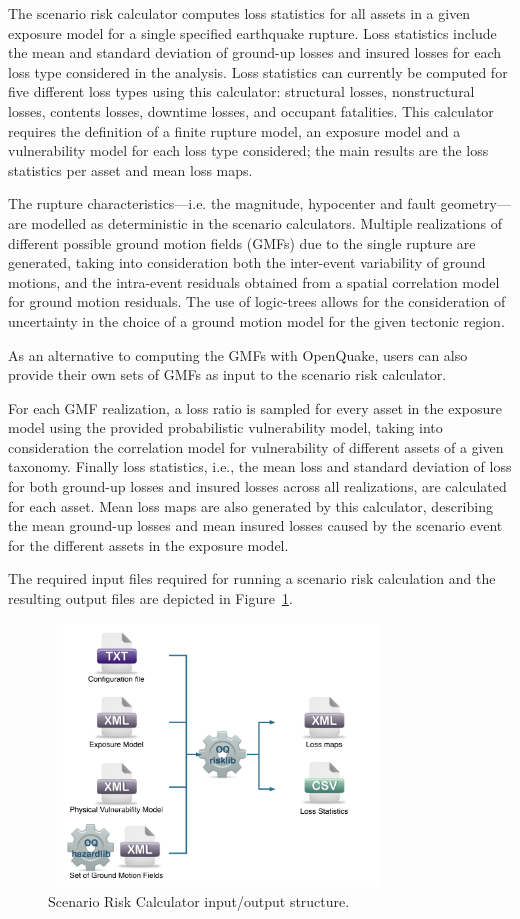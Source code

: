 The scenario risk calculator computes loss statistics for all assets in a
given exposure model for a single specified earthquake rupture. Loss
statistics include the mean and standard deviation of ground-up losses and
insured losses for each loss type considered in the analysis. Loss statistics
can currently be computed for five different loss types using this calculator:
structural losses, nonstructural losses, contents losses, downtime losses, and
occupant fatalities. This calculator requires the definition of a finite
rupture model, an exposure model and a vulnerability model for each loss type
considered; the main results are the loss statistics per asset and mean loss
maps.

The rupture characteristics—i.e. the magnitude, hypocenter and fault
geometry—are modelled as deterministic in the scenario calculators. Multiple
realizations of different possible ground motion fields (GMFs) due to the
single rupture are generated, taking into consideration both the inter-event
variability of ground motions, and the intra-event residuals obtained from a
spatial correlation model for ground motion residuals. The use of logic-trees
allows for the consideration of uncertainty in the choice of a ground motion
model for the given tectonic region.

As an alternative to computing the GMFs with OpenQuake, users can also provide
their own sets of GMFs as input to the scenario risk calculator.

For each GMF realization, a loss ratio is sampled for every asset in the
exposure model using the provided probabilistic vulnerability model, taking
into consideration the correlation model for vulnerability of different assets
of a given taxonomy. Finally loss statistics, i.e., the mean loss and standard
deviation of loss for both ground-up losses and insured losses across all
realizations, are calculated for each asset. Mean loss maps are also generated
by this calculator, describing the mean ground-up losses and mean insured
losses caused by the scenario event for the different assets in the exposure
model.

The required input files required for running a scenario risk calculation and
the resulting output files are depicted in Figure~\ref{fig:io-structure-scenario-risk}.

\begin{figure}[ht]
\centering
\includegraphics[width=9cm,height=7cm]{figures/risk/io-structure-scenario-risk.pdf}
\caption{Scenario Risk Calculator input/output structure.}
\label{fig:io-structure-scenario-risk}
\end{figure}